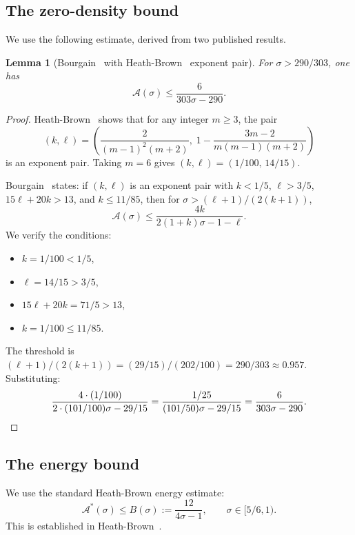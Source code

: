 \documentclass[11pt,a4paper]{amsart}
\theoremstyle{plain}
\newtheorem{lemma}[theorem]{Lemma}
\theoremstyle{definition}
\begin{document}
\subsection{The zero-density bound}

We use the following estimate, derived from two published results.

\begin{lemma}[{Bourgain~\cite[Proposition~3]{Bourgain1995} with Heath-Brown~\cite[Theorem~2]{HeathBrown2017} exponent pair}]
\label{lem:zd}
For $\sigma > 290/303$, one has
\begin{equation}\label{eq:zd_bound}
\mathcal{A}(\sigma) \leq \frac{6}{303\sigma - 290}.
\end{equation}
\end{lemma}

\begin{proof}
Heath-Brown~\cite[Theorem~2]{HeathBrown2017} shows that for any integer $m \geq 3$, the pair
\[
(k, \ell) = \left(\frac{2}{(m-1)^2(m+2)},\; 1 - \frac{3m-2}{m(m-1)(m+2)}\right)
\]
is an exponent pair. Taking $m = 6$ gives $(k, \ell) = (1/100,\, 14/15)$.

Bourgain~\cite[Proposition~3]{Bourgain1995} states: if $(k,\ell)$ is an exponent pair with $k < 1/5$, $\ell > 3/5$, $15\ell + 20k > 13$, and $k \leq 11/85$, then for $\sigma > (\ell+1)/(2(k+1))$,
\[
\mathcal{A}(\sigma) \leq \frac{4k}{2(1+k)\sigma - 1 - \ell}.
\]
We verify the conditions:
\begin{itemize}[nosep]
\item $k = 1/100 < 1/5$,
\item $\ell = 14/15 > 3/5$,
\item $15\ell + 20k = 71/5 > 13$,
\item $k = 1/100 \leq 11/85$.
\end{itemize}
The threshold is $(\ell + 1)/(2(k+1)) = (29/15)/(202/100) = 290/303 \approx 0.957$. Substituting:
\[
\frac{4 \cdot (1/100)}{2 \cdot (101/100)\sigma - 29/15} = \frac{1/25}{(101/50)\sigma - 29/15} = \frac{6}{303\sigma - 290}. \qedhere
\]
\end{proof}

\subsection{The energy bound}

We use the standard Heath-Brown energy estimate:
\begin{equation}\label{eq:energy}
\mathcal{A}^*(\sigma) \leq B(\sigma) := \frac{12}{4\sigma - 1}, \qquad \sigma \in [5/6, 1).
\end{equation}
This is established in Heath-Brown~\cite{HeathBrown1979}.
\end{document}
